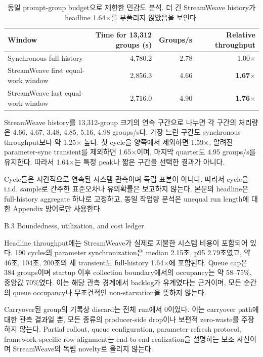 \begin{table}[h]
\centering
\begin{tabular}{lrrr}
\hline
Window & Time for 13{,}312 groups (s) & Groups/s & Relative throughput \\
\hline
Synchronous full history & 4{,}780.2 & 2.78 & 1.00$\times$ \\
StreamWeave first equal-work window & 2{,}856.3 & 4.66 & \textbf{1.67$\times$} \\
StreamWeave last equal-work window & 2{,}716.0 & 4.90 & \textbf{1.76$\times$} \\
\hline
\end{tabular}
\caption{동일 prompt-group budget으로 제한한 민감도 분석. 더 긴 StreamWeave history가
headline 1.64$\times$를 부풀리지 않았음을 보인다.}
\label{tab:equal-work-sensitivity}
\end{table}

StreamWeave history를 13{,}312-group 크기의 연속 구간으로 나누면 각 구간의 처리량은
4.66, 4.67, 3.48, 4.85, 5.16, 4.98 groups/s다. 가장 느린 구간도 synchronous throughput보다
약 1.25$\times$ 높다. 첫 cycle을 양쪽에서 제외하면 1.59$\times$, 알려진 parameter-sync
transient를 제외하면 1.65$\times$이며, 마지막 quarter도 4.95 groups/s를 유지한다. 따라서
1.64$\times$는 특정 peak나 짧은 구간을 선택한 결과가 아니다.

Cycle들은 시간적으로 연속된 시스템 관측이며 독립 표본이 아니다. 따라서 cycle을 i.i.d. sample로
간주한 표준오차나 유의확률은 보고하지 않는다. 본문의 headline은 full-history aggregate 하나로
고정하고, 동일 작업량 분석은 unequal run length에 대한 Appendix 방어로만 사용한다.

B.3 Boundedness, utilization, and cost ledger

Headline throughput에는 StreamWeave가 실제로 지불한 시스템 비용이 포함되어 있다. 190 cycles의
parameter synchronization은 median 2.15초, p95 2.79초였고, 약 46초, 104초, 200초의 세 transient도
full-history 1.64$\times$에 포함된다. Queue cap은 384 groups이며 startup 이후 collection
boundary에서의 occupancy는 약 58--75\%, 중앙값 70\%였다. 이는 해당 관측 경계에서 backlog가
유계였다는 근거이며, 모든 순간의 queue occupancy나 무조건적인 non-starvation을 뜻하지 않는다.

Carryover된 group의 기록상 discard는 전체 run에서 0이었다. 이는 carryover path에 대한 관측 결과일
뿐, 모든 종류의 producer-side drop이나 보편적 zero-waste를 주장하지 않는다. Partial rollout,
queue configuration, parameter-refresh protocol, framework-specific row alignment는 end-to-end
realization을 설명하는 보조 자산이며 StreamWeave의 독립 novelty로 올리지 않는다.

